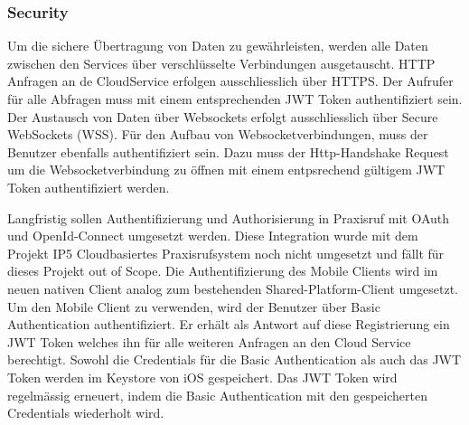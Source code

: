 \subsubsection{Security}

Um die sichere Übertragung von Daten zu gewährleisten, werden alle Daten zwischen den Services über verschlüsselte Verbindungen ausgetauscht.
HTTP Anfragen an de CloudService erfolgen ausschliesslich über HTTPS.
Der Aufrufer für alle Abfragen muss mit einem entsprechenden JWT Token authentifiziert sein.
Der Austausch von Daten über Websockets erfolgt ausschliesslich über Secure WebSockets (WSS).
Für den Aufbau von Websocketverbindungen, muss der Benutzer ebenfalls authentifiziert sein.
Dazu muss der Http-Handshake Request um die Websocketverbindung zu öffnen mit einem entpsrechend gültigem JWT Token authentifiziert werden.

Langfristig sollen Authentifizierung und Authorisierung in Praxisruf mit OAuth und OpenId-Connect umgesetzt werden.
Diese Integration wurde mit dem Projekt IP5 Cloudbasiertes Praxisrufsystem noch nicht umgesetzt und fällt für dieses Projekt out of Scope.
Die Authentifizierung des Mobile Clients wird im neuen nativen Client analog zum bestehenden Shared-Platform-Client umgesetzt.
Um den Mobile Client zu verwenden, wird der Benutzer über Basic Authentication authentifiziert.
Er erhält als Antwort auf diese Registrierung ein JWT Token welches ihn für alle weiteren Anfragen an den Cloud Service berechtigt.
Sowohl die Credentials für die Basic Authentication als auch das JWT Token werden im Keystore von iOS gespeichert.
Das JWT Token wird regelmässig erneuert, indem die Basic Authentication mit den gespeicherten Credentials wiederholt wird.

\clearpage
